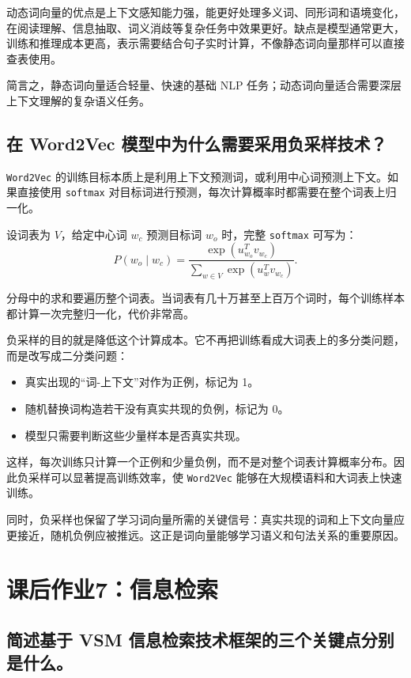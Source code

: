 动态词向量的优点是上下文感知能力强，能更好处理多义词、同形词和语境变化，在阅读理解、信息抽取、词义消歧等复杂任务中效果更好。缺点是模型通常更大，训练和推理成本更高，表示需要结合句子实时计算，不像静态词向量那样可以直接查表使用。

简言之，静态词向量适合轻量、快速的基础 NLP 任务；动态词向量适合需要深层上下文理解的复杂语义任务。

\subsection{在 Word2Vec 模型中为什么需要采用负采样技术？}

\texttt{Word2Vec} 的训练目标本质上是利用上下文预测词，或利用中心词预测上下文。如果直接使用 \texttt{softmax} 对目标词进行预测，每次计算概率时都需要在整个词表上归一化。

设词表为 $V$，给定中心词 $w_c$ 预测目标词 $w_o$ 时，完整 \texttt{softmax} 可写为：
\[
  P(w_o \mid w_c)
  =
  \frac{\exp(u_{w_o}^T v_{w_c})}
       {\sum_{w \in V} \exp(u_w^T v_{w_c})}.
\]

分母中的求和要遍历整个词表。当词表有几十万甚至上百万个词时，每个训练样本都计算一次完整归一化，代价非常高。

负采样的目的就是降低这个计算成本。它不再把训练看成大词表上的多分类问题，而是改写成二分类问题：
\begin{itemize}
  \item 真实出现的“词-上下文”对作为正例，标记为 1。
  \item 随机替换词构造若干没有真实共现的负例，标记为 0。
  \item 模型只需要判断这些少量样本是否真实共现。
\end{itemize}

这样，每次训练只计算一个正例和少量负例，而不是对整个词表计算概率分布。因此负采样可以显著提高训练效率，使 \texttt{Word2Vec} 能够在大规模语料和大词表上快速训练。

同时，负采样也保留了学习词向量所需的关键信号：真实共现的词和上下文向量应更接近，随机负例应被推远。这正是词向量能够学习语义和句法关系的重要原因。

\section{课后作业7：信息检索}

\subsection{简述基于 VSM 信息检索技术框架的三个关键点分别是什么。}

